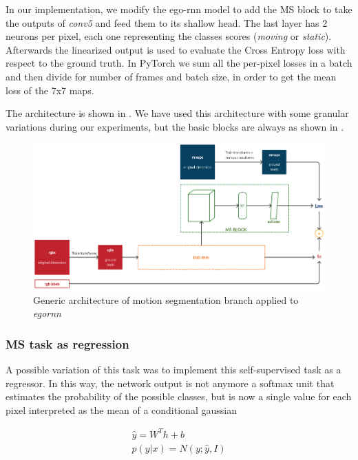 \documentclass[10pt,twocolumn,hidelinks,letterpaper]{article}
\begin{document}
In our implementation, we modify the ego-rnn model to add the MS block to take the outputs of \textit{conv5} and feed them to its shallow head. The last layer
has 2 neurons per pixel, each one representing the classes scores (\textit{moving} or \textit{static}). Afterwards the linearized output is used to evaluate the Cross Entropy loss with respect to the ground truth. In PyTorch we sum all the per-pixel losses in a batch and then divide for number of frames and batch size, in order to get the mean loss of the 7x7 maps.

The architecture is shown in . We have used this architecture with some granular variations during our experiments, but the basic blocks are always as shown in .

\begin{figure}
  \centering
  \includegraphics[width=\linewidth]{images/egornn+msblock_architecture.png}
  \caption{Generic architecture of motion segmentation branch applied to \textit{egornn}}
  \label{msblock_arch}
\end{figure}

\subsubsection{MS task as regression}

A possible variation of this task was to implement this self-supervised task as a regressor. In this way, the network output is not anymore a softmax unit that estimates the probability of the possible classes, but is now a single value for each pixel interpreted as the mean of a conditional gaussian

\begin{align*}
\hat{y} = W^Th + b\\
p(y|x) = N(y; \hat{y},I)\\
\end{align*}
\end{document}
